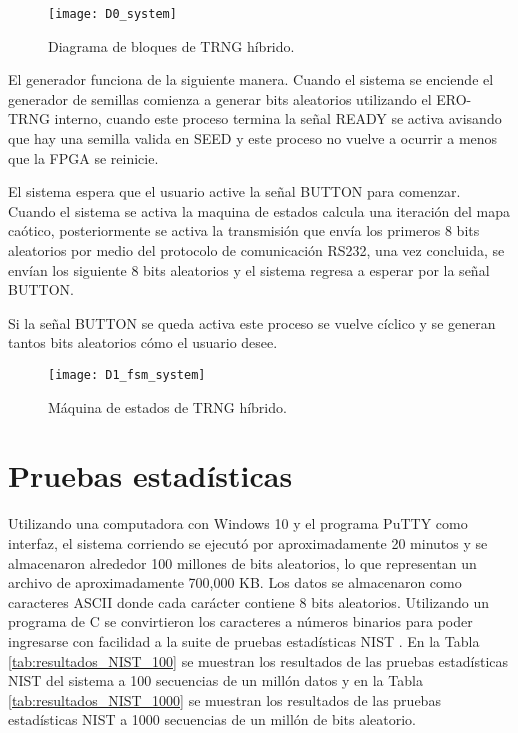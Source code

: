          \begin{figure}[hbtp]
            \centering
            \texttt{[image: D0\_system]}
            \caption{Diagrama de bloques de TRNG híbrido.}
            \label{fig:D0_system}
        \end{figure}

        El generador funciona de la siguiente manera. Cuando el sistema se enciende el generador de semillas comienza a generar bits aleatorios utilizando el ERO-TRNG interno, cuando este proceso termina la señal READY se activa avisando que hay una semilla valida en SEED y este proceso no vuelve a ocurrir a menos que la FPGA se reinicie.

       El sistema espera que el usuario active la señal BUTTON para comenzar. Cuando el sistema se activa la maquina de estados calcula una iteración del mapa caótico, posteriormente se activa la transmisión que envía los primeros 8 bits aleatorios por medio del protocolo de comunicación RS232, una vez concluida, se envían los siguiente 8 bits aleatorios y el sistema regresa a esperar por la señal BUTTON. 

       Si la señal BUTTON se queda activa este proceso se vuelve cíclico y se generan tantos bits aleatorios cómo el usuario desee.

       \begin{figure}[hbtp]
            \centering
            \texttt{[image: D1\_fsm\_system]}
            \caption{Máquina de estados de TRNG híbrido.}
            \label{fig:D1_fsm_system}
        \end{figure}

        \section{Pruebas estadísticas}

        Utilizando una computadora con Windows 10 y el programa PuTTY como interfaz, el sistema corriendo se ejecutó por aproximadamente 20 minutos y se almacenaron alrededor 100 millones de bits aleatorios, lo que representan un archivo de aproximadamente 700,000 KB. Los datos se almacenaron como caracteres ASCII donde cada carácter contiene 8 bits aleatorios. Utilizando un programa de C se convirtieron los caracteres a números binarios para poder ingresarse con facilidad a la suite de pruebas estadísticas NIST \cite{Nist2010,Turan2018}. En la Tabla \ref{tab:resultados_NIST_100} se muestran los resultados de las pruebas estadísticas NIST del sistema a 100 secuencias de un millón datos y en la Tabla \ref{tab:resultados_NIST_1000} se muestran los resultados de las pruebas estadísticas NIST a 1000 secuencias de un millón de bits aleatorio.

